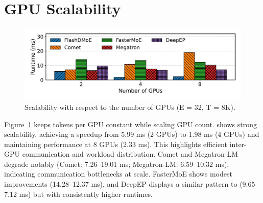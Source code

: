 \section{GPU Scalability}\label{sec:gpu-scalability}
\begin{figure}[!ht]
    \centering
    \includegraphics[width=\textwidth, keepaspectratio]{figures/scaling_gpus}
    \caption{Scalability with respect to the number of GPUs (E = 32, T = 8K).}
    \label{fig:scalability-gpus}
\end{figure}
Figure~\ref{fig:scalability-gpus} keeps tokens per GPU constant while scaling GPU count.
\sysname shows strong scalability, achieving a speedup from 5.99 ms (2 GPUs) to 1.98 ms (4 GPUs)
and maintaining performance at 8 GPUs (2.33 ms).
This highlights efficient inter-GPU communication and workload distribution.
Comet and Megatron-LM degrade notably (Comet: 7.26–19.01 ms; Megatron-LM: 6.59–10.32 ms),
indicating communication bottlenecks at scale.
FasterMoE shows modest improvements (14.28–12.37 ms),
and DeepEP displays a similar pattern to \sysname (9.65–7.12 ms) but with consistently higher runtimes.
